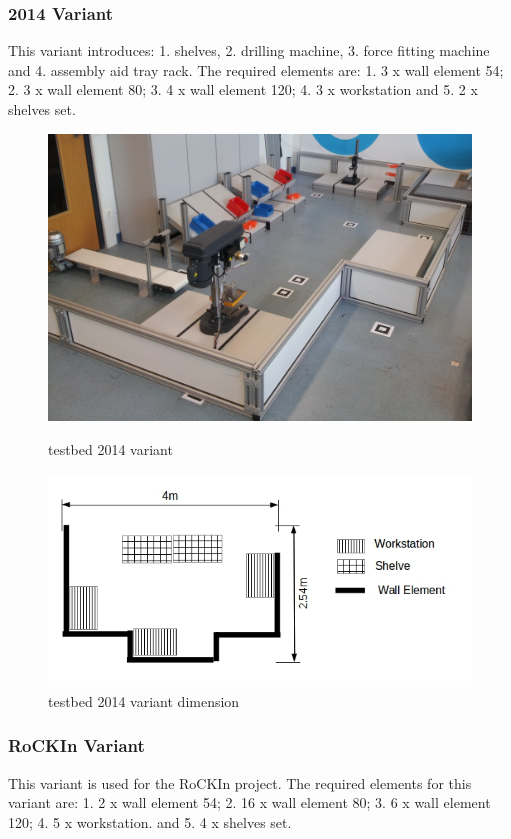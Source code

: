 \subsubsection{2014 Variant}
	This variant introduces: 1. shelves, 2. drilling machine, 3. force fitting machine and 4. assembly aid tray rack. The required elements are: 1. 3 x wall element 54; 2. 3 x wall element 80; 3. 4 x wall element 120; 4. 3 x workstation and 5. 2 x shelves set. 

\begin{figure}[htb]
 \begin{center}
 \includegraphics[width=14cm]{./fig/WorkArenaBRSU2014.jpg} 
 \caption{\roaw testbed 2014 variant}
 \label{fig:RoawTestBed2014} 

 \includegraphics[width=14cm]{./fig/WorkArenaBRSU2014Dimension.jpg} 
 \end{center}
 \caption{\roaw testbed 2014 variant dimension}
  \label{fig:RoawTestBed2013Dimension} 
\end{figure}

\clearpage
\subsubsection{RoCKIn Variant}
	This variant is used for the RoCKIn project. The required elements for this variant are: 1. 2 x wall element 54; 2. 16 x wall element 80; 3. 6 x wall element 120; 4. 5 x workstation. and 5. 4 x shelves set.
	
